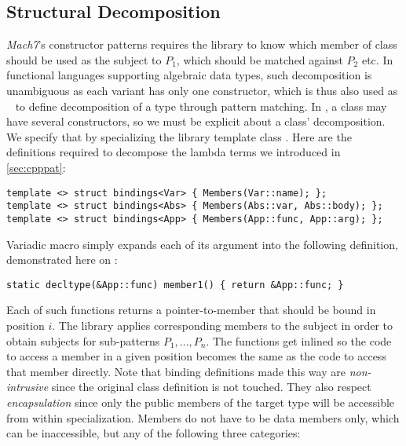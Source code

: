 \subsection{Structural Decomposition}
\label{sec:bnd}

\emph{Mach7}'s constructor patterns  requires the 
library to know which member of class  should be used as the subject to 
$P_1$, which should be matched against $P_2$ etc. In functional languages 
supporting algebraic data types, such decomposition is unambiguous as each 
variant has only one constructor, which is thus also used as ~\cite{padl08,Thorn2012} to define
decomposition of a type through pattern matching. In \Cpp{}, a class may have 
several constructors, so we must be explicit about a class' decomposition.
We specify that by specializing the library template class . 
Here are the definitions required to decompose the 
lambda terms we introduced in \textsection\ref{sec:cpppat}:

\begin{lstlisting}
template <> struct bindings<Var> { Members(Var::name); };
template <> struct bindings<Abs> { Members(Abs::var, Abs::body); };
template <> struct bindings<App> { Members(App::func, App::arg); };
\end{lstlisting}

\noindent
Variadic macro  simply expands each of its argument into the 
following definition, demonstrated here on :

\begin{lstlisting}
static decltype(&App::func) member1() { return &App::func; }
\end{lstlisting}

\noindent
Each of such functions returns a pointer-to-member that should be bound in 
position $i$. The library applies corresponding members to the subject in order 
to obtain subjects for sub-patterns $P_1,...,P_n$. The functions get inlined so 
the code to access a member in a given position becomes the same as the 
code to access that member directly. Note that binding definitions made this way 
are \emph{non-intrusive} since the original class definition is not touched. 
They also respect \emph{encapsulation} since only the public members of the 
target type will be accessible from within  specialization. 
Members do not have to be data members only, which can be inaccessible, but any 
of the following three categories:


